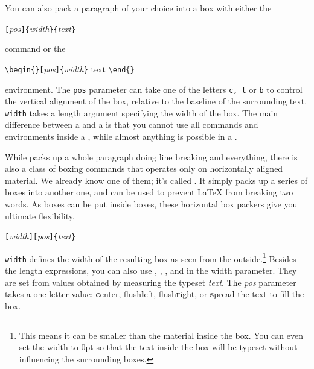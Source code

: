 You can also pack a paragraph of your choice into a box with either
the

\begin{lscommand}
  \verb|[|\emph{pos}\verb|]{|\emph{width}\verb|}{|\emph{text}\verb|}|
\end{lscommand}

\noindent command or the

\begin{lscommand}
  \verb|\begin{|\verb|}[|\emph{pos}\verb|]{|\emph{width}\verb|}| text
  \verb|\end{|\verb|}|
\end{lscommand}

\noindent environment. The \texttt{pos} parameter can take one of the letters
\texttt{c, t} or \texttt{b} to control the vertical alignment of the box,
relative to the baseline of the surrounding text. \texttt{width} takes
a length argument specifying the width of the box. The main difference
between a  and a  is that you cannot use all commands
and environments inside a , while almost anything is possible in
a .

While  packs up a whole paragraph doing line breaking and
everything, there is also a class of boxing commands that operates
only on horizontally aligned material. We already know one of them;
it's called . It simply packs up a series of boxes into
another one, and can be used to prevent \LaTeX{} from breaking two
words. As boxes can be put inside boxes, these horizontal box packers
give you ultimate flexibility.

\begin{lscommand}
  \verb|[|\emph{width}\verb|][|\emph{pos}\verb|]{|\emph{text}\verb|}|
\end{lscommand}

\noindent \texttt{width} defines the width of the resulting box as
seen from the outside.\footnote{This means it can be smaller than the
  material inside the box. You can even set the
  width to 0pt so that the text inside the box will be typeset without
  influencing the surrounding boxes.}  Besides the length
expressions, you can also use , , , and
 in the width parameter. They are set from values
obtained by measuring the typeset \emph{text}. The \emph{pos} parameter takes
a one letter value: \textbf{c}enter, flush\textbf{l}eft,
flush\textbf{r}ight, or \textbf{s}pread the text to fill the box.


